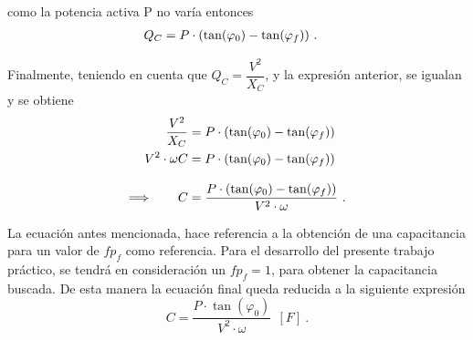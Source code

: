                \noindent como la potencia activa P no varía entonces
               \begin{align}
                  Q_C   &= P\cdot (\tan(\varphi_0) - \tan(\varphi_f))~. \notag
               \end{align}

               \noindent Finalmente, teniendo en cuenta que $Q_C= \dfrac{V^{2}}{X_C}$, y la expresión anterior, se igualan
               y se obtiene 
               \begin{align}
                  \dfrac{V^{2}}{X_C} &=  P\cdot (\tan(\varphi_0) - \tan(\varphi_f))  \notag\\
                  V^{2}\cdot \omega C &= P\cdot (\tan(\varphi_0) - \tan(\varphi_f))  \notag\\[3mm]
                  \Longrightarrow \hspace{20pt}C &= \dfrac{P\cdot (\tan(\varphi_0) - \tan(\varphi_f))}{V^{2}\cdot \omega}~. \notag
               \end{align}

               \noindent La ecuación antes mencionada, hace referencia a la obtención de una capacitancia 
               para un valor de \(fp_f\) como referencia. Para el desarrollo del presente trabajo práctico, 
               se tendrá en consideración un \(fp_f = 1\), para obtener la capacitancia buscada.
               De esta manera la ecuación final queda reducida a la siguiente expresión
                  \begin{equation}
                    \boxed{C = \dfrac{P\cdot \tan(\varphi_0)}{V^{2}\cdot \omega}~~[F]}~. \label{eqn:CorrecFp}
                  \end{equation}

               
               



							












